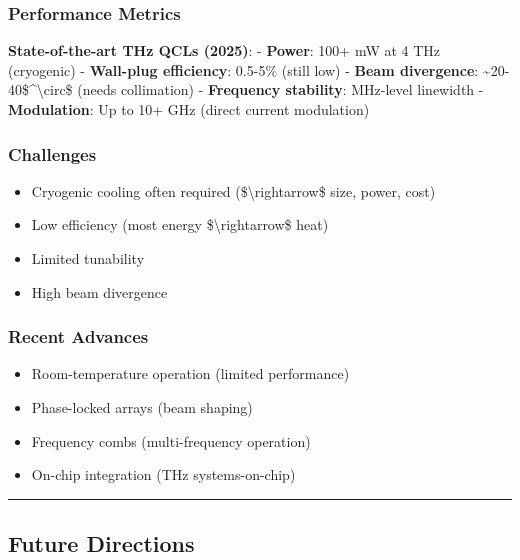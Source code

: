 \subsubsection{Performance Metrics}\label{performance-metrics}

\textbf{State-of-the-art THz QCLs (2025)}: - \textbf{Power}: 100+ mW at
4 THz (cryogenic) - \textbf{Wall-plug efficiency}: 0.5-5\% (still low) -
\textbf{Beam divergence}:
\textasciitilde20-40\$\^{}\textbackslash circ\$ (needs collimation) -
\textbf{Frequency stability}: MHz-level linewidth - \textbf{Modulation}:
Up to 10+ GHz (direct current modulation)

\subsubsection{Challenges}\label{challenges}

\begin{itemize}
\tightlist
\item
  Cryogenic cooling often required (\$\textbackslash rightarrow\$ size,
  power, cost)
\item
  Low efficiency (most energy \$\textbackslash rightarrow\$ heat)
\item
  Limited tunability
\item
  High beam divergence
\end{itemize}

\subsubsection{Recent Advances}\label{recent-advances}

\begin{itemize}
\tightlist
\item
  Room-temperature operation (limited performance)
\item
  Phase-locked arrays (beam shaping)
\item
  Frequency combs (multi-frequency operation)
\item
  On-chip integration (THz systems-on-chip)
\end{itemize}

\begin{center}\rule{0.5\linewidth}{0.5pt}\end{center}

\subsection{Future Directions}\label{future-directions}

